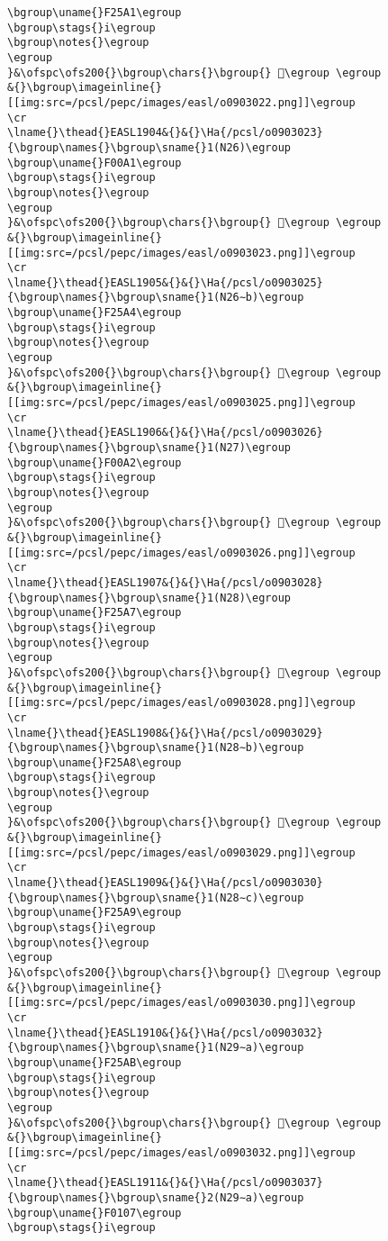 \begin{verbatim}
\bgroup\uname{}F25A1\egroup
\bgroup\stags{}i\egroup
\bgroup\notes{}\egroup
\egroup
}&\ofspc\ofs200{}\bgroup\chars{}\bgroup{} 󲖡\egroup \egroup
&{}\bgroup\imageinline{}[[img:src=/pcsl/pepc/images/easl/o0903022.png]]\egroup
\cr
\lname{}\thead{}EASL1904&{}&{}\Ha{/pcsl/o0903023}{\bgroup\names{}\bgroup\sname{}1(N26)\egroup
\bgroup\uname{}F00A1\egroup
\bgroup\stags{}i\egroup
\bgroup\notes{}\egroup
\egroup
}&\ofspc\ofs200{}\bgroup\chars{}\bgroup{} 󰂡\egroup \egroup
&{}\bgroup\imageinline{}[[img:src=/pcsl/pepc/images/easl/o0903023.png]]\egroup
\cr
\lname{}\thead{}EASL1905&{}&{}\Ha{/pcsl/o0903025}{\bgroup\names{}\bgroup\sname{}1(N26∼b)\egroup
\bgroup\uname{}F25A4\egroup
\bgroup\stags{}i\egroup
\bgroup\notes{}\egroup
\egroup
}&\ofspc\ofs200{}\bgroup\chars{}\bgroup{} 󲖤\egroup \egroup
&{}\bgroup\imageinline{}[[img:src=/pcsl/pepc/images/easl/o0903025.png]]\egroup
\cr
\lname{}\thead{}EASL1906&{}&{}\Ha{/pcsl/o0903026}{\bgroup\names{}\bgroup\sname{}1(N27)\egroup
\bgroup\uname{}F00A2\egroup
\bgroup\stags{}i\egroup
\bgroup\notes{}\egroup
\egroup
}&\ofspc\ofs200{}\bgroup\chars{}\bgroup{} 󰂢\egroup \egroup
&{}\bgroup\imageinline{}[[img:src=/pcsl/pepc/images/easl/o0903026.png]]\egroup
\cr
\lname{}\thead{}EASL1907&{}&{}\Ha{/pcsl/o0903028}{\bgroup\names{}\bgroup\sname{}1(N28)\egroup
\bgroup\uname{}F25A7\egroup
\bgroup\stags{}i\egroup
\bgroup\notes{}\egroup
\egroup
}&\ofspc\ofs200{}\bgroup\chars{}\bgroup{} 󲖧\egroup \egroup
&{}\bgroup\imageinline{}[[img:src=/pcsl/pepc/images/easl/o0903028.png]]\egroup
\cr
\lname{}\thead{}EASL1908&{}&{}\Ha{/pcsl/o0903029}{\bgroup\names{}\bgroup\sname{}1(N28∼b)\egroup
\bgroup\uname{}F25A8\egroup
\bgroup\stags{}i\egroup
\bgroup\notes{}\egroup
\egroup
}&\ofspc\ofs200{}\bgroup\chars{}\bgroup{} 󲖨\egroup \egroup
&{}\bgroup\imageinline{}[[img:src=/pcsl/pepc/images/easl/o0903029.png]]\egroup
\cr
\lname{}\thead{}EASL1909&{}&{}\Ha{/pcsl/o0903030}{\bgroup\names{}\bgroup\sname{}1(N28∼c)\egroup
\bgroup\uname{}F25A9\egroup
\bgroup\stags{}i\egroup
\bgroup\notes{}\egroup
\egroup
}&\ofspc\ofs200{}\bgroup\chars{}\bgroup{} 󲖩\egroup \egroup
&{}\bgroup\imageinline{}[[img:src=/pcsl/pepc/images/easl/o0903030.png]]\egroup
\cr
\lname{}\thead{}EASL1910&{}&{}\Ha{/pcsl/o0903032}{\bgroup\names{}\bgroup\sname{}1(N29∼a)\egroup
\bgroup\uname{}F25AB\egroup
\bgroup\stags{}i\egroup
\bgroup\notes{}\egroup
\egroup
}&\ofspc\ofs200{}\bgroup\chars{}\bgroup{} 󲖫\egroup \egroup
&{}\bgroup\imageinline{}[[img:src=/pcsl/pepc/images/easl/o0903032.png]]\egroup
\cr
\lname{}\thead{}EASL1911&{}&{}\Ha{/pcsl/o0903037}{\bgroup\names{}\bgroup\sname{}2(N29∼a)\egroup
\bgroup\uname{}F0107\egroup
\bgroup\stags{}i\egroup

\end{verbatim}
